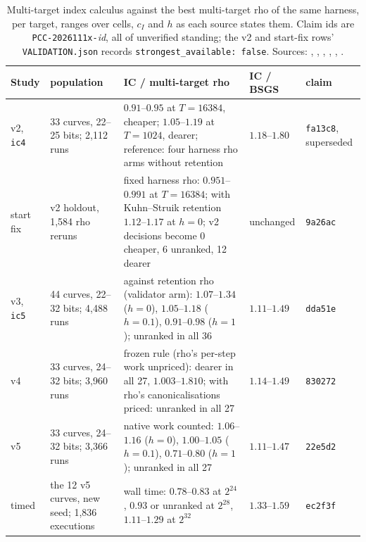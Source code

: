 \begin{table}[t]
\centering\footnotesize
\begin{tabularx}{\linewidth}{@{}l>{\raggedright}p{2.3cm}>{\raggedright}Xll@{}}
\toprule
Study & population & IC / multi-target rho & IC / BSGS & claim \\
\midrule
v2, \texttt{ic4} & 33 curves, 22--25 bits; 2{,}112 runs & $0.91$--$0.95$ at $T=16384$, cheaper; $1.05$--$1.19$ at $T=1024$, dearer; reference: four harness rho arms without retention & $1.18$--$1.80$ & \texttt{fa13c8}, superseded \\
start fix & v2 holdout, 1{,}584 rho reruns & fixed harness rho: $0.951$--$0.991$ at $T=16384$; with Kuhn--Struik retention $1.12$--$1.17$ at $h=0$; v2 decisions become 0 cheaper, 6 unranked, 12 dearer & unchanged & \texttt{9a26ac} \\
v3, \texttt{ic5} & 44 curves, 22--32 bits; 4{,}488 runs & against retention rho (validator arm): $1.07$--$1.34$ ($h=0$), $1.05$--$1.18$ ($h=0.1$), $0.91$--$0.98$ ($h=1$); unranked in all 36 & $1.11$--$1.49$ & \texttt{dda51e} \\
v4 & 33 curves, 24--32 bits; 3{,}960 runs & frozen rule (rho's per-step work unpriced): dearer in all 27, $1.003$--$1.810$; with rho's canonicalisations priced: unranked in all 27 & $1.14$--$1.49$ & \texttt{830272} \\
v5 & 33 curves, 24--32 bits; 3{,}366 runs & native work counted: $1.06$--$1.16$ ($h=0$), $1.00$--$1.05$ ($h=0.1$), $0.71$--$0.80$ ($h=1$); unranked in all 27 & $1.11$--$1.47$ & \texttt{22e5d2} \\
timed & the 12 v5 curves, new seed; 1{,}836 executions & wall time: $0.78$--$0.83$ at $2^{24}$, $0.93$ or unranked at $2^{28}$, $1.11$--$1.29$ at $2^{32}$ & $1.33$--$1.59$ & \texttt{ec2f3f} \\
\bottomrule
\end{tabularx}
\caption[]{Multi-target index calculus against the best multi-target rho
of the same harness, per target, ranges over cells, $c_I$ and $h$ as each
source states them. Claim ids are \texttt{PCC-2026111x-}\emph{id}, all of
unverified standing; the v2 and start-fix rows' \texttt{VALIDATION.json}
records \texttt{strongest\_available: false}. Sources:
,
,
,
,
,
.}
\label{tab:pg-mt}
\end{table}

